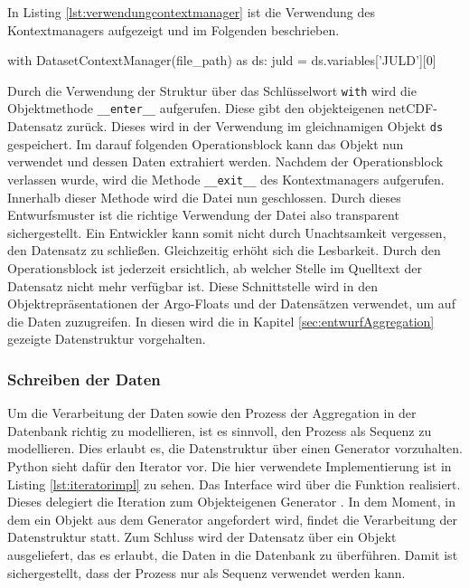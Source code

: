 In Listing \ref{lst:verwendungcontextmanager} ist die Verwendung des Kontextmanagers aufgezeigt und im Folgenden beschrieben.

\begin{python}[%
caption={Die Verwendung des Kontextmanagers},%
label={lst:verwendungcontextmanager}]
with DatasetContextManager(file_path) as ds:
    juld = ds.variables['JULD'][0]
\end{python}


Durch die Verwendung der Struktur über das Schlüsselwort \texttt{with} wird die Objektmethode \texttt{\_\_enter\_\_} aufgerufen. Diese gibt den objekteigenen netCDF-Datensatz zurück. Dieses wird in der Verwendung im gleichnamigen Objekt \texttt{ds} gespeichert. Im darauf folgenden Operationsblock kann das Objekt nun verwendet und dessen Daten extrahiert werden. Nachdem der Operationsblock verlassen wurde, wird die Methode \texttt{\_\_exit\_\_} des Kontextmanagers aufgerufen. Innerhalb dieser Methode wird die Datei nun geschlossen.  Durch dieses Entwurfsmuster ist die richtige Verwendung der Datei also transparent sichergestellt. Ein Entwickler kann somit nicht durch Unachtsamkeit vergessen, den Datensatz zu schließen. Gleichzeitig erhöht sich die Lesbarkeit. Durch den Operationsblock ist jederzeit ersichtlich, ab welcher Stelle im Quelltext der Datensatz nicht mehr verfügbar ist.
Diese Schnittstelle wird in den Objektrepräsentationen der Argo-Floats und der Datensätzen verwendet, um auf die Daten zuzugreifen. In diesen wird die in Kapitel \ref{sec:entwurfAggregation} gezeigte Datenstruktur vorgehalten.


\subsubsection{Schreiben der Daten}

Um die Verarbeitung der Daten sowie den Prozess der Aggregation in der Datenbank richtig zu modellieren, ist es sinnvoll, den Prozess als Sequenz zu modellieren. Dies erlaubt es, die Datenstruktur über einen Generator vorzuhalten. Python sieht dafür den Iterator vor.
Die hier verwendete Implementierung ist in Listing \ref{lst:iteratorimpl} zu sehen. Das Interface wird über die Funktion  realisiert.
Dieses delegiert die Iteration zum Objekteigenen Generator . In dem Moment, in dem ein Objekt aus dem Generator angefordert wird, findet die Verarbeitung der Datenstruktur statt.
Zum Schluss wird der Datensatz über ein Objekt ausgeliefert, das es erlaubt, die Daten in die Datenbank zu überführen.
Damit ist sichergestellt, dass der Prozess nur als Sequenz verwendet werden kann.

